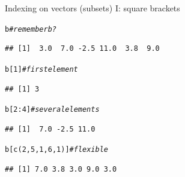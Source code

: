 \documentclass[xcolor=table,           xcolor=dvipsnames]{beamer}\usepackage[]{graphicx}\usepackage[]{color}
\makeatletter
\newcommand{\hlnum}[1]{\textcolor[rgb]{0,0,0}{#1}}
\newcommand{\hlcom}[1]{\textcolor[rgb]{0,0.392,0}{\textit{#1}}}
\newcommand{\hlopt}[1]{\textcolor[rgb]{0,0,0}{#1}}
\newcommand{\hlstd}[1]{\textcolor[rgb]{0,0,0}{#1}}
\newcommand{\hlkwd}[1]{\textcolor[rgb]{0,0,1}{#1}}
\newenvironment{kframe}{%
 \def\at@end@of@kframe{}%
 \ifinner\ifhmode%
  \def\at@end@of@kframe{\end{minipage}}%
  \begin{minipage}{\columnwidth}%
 \fi\fi%
 \def\FrameCommand##1{\hskip\@totalleftmargin \hskip-\fboxsep
 \colorbox{shadecolor}{##1}\hskip-\fboxsep
     \hskip-\linewidth \hskip-\@totalleftmargin \hskip\columnwidth}%
 \MakeFramed {\advance\hsize-\width
   \@totalleftmargin\z@ \linewidth\hsize
   \@setminipage}}%
 {\par\unskip\endMakeFramed%
 \at@end@of@kframe}
\newenvironment{knitrout}{}{} %
\makeatother
\begin{document}
\begin{frame}[fragile]{Indexing on vectors (subsets) I: square brackets}
\begin{knitrout}
\color{fgcolor}\begin{kframe}
\begin{alltt}
\hlstd{b} \hlcom{# remember b?}
\end{alltt}
\begin{verbatim}
## [1]  3.0  7.0 -2.5 11.0  3.8  9.0
\end{verbatim}
\begin{alltt}
\hlstd{b[}\hlnum{1}\hlstd{]} \hlcom{# first element}
\end{alltt}
\begin{verbatim}
## [1] 3
\end{verbatim}
\end{kframe}
\end{knitrout}
\begin{knitrout}
\color{fgcolor}\begin{kframe}
\begin{alltt}
\hlstd{b[}\hlnum{2}\hlopt{:}\hlnum{4}\hlstd{]} \hlcom{# several elements}
\end{alltt}
\begin{verbatim}
## [1]  7.0 -2.5 11.0
\end{verbatim}
\begin{alltt}
\hlstd{b[} \hlkwd{c}\hlstd{(}\hlnum{2}\hlstd{,}\hlnum{5}\hlstd{,}\hlnum{1}\hlstd{,}\hlnum{6}\hlstd{,}\hlnum{1}\hlstd{) ]} \hlcom{# flexible}
\end{alltt}
\begin{verbatim}
## [1] 7.0 3.8 3.0 9.0 3.0
\end{verbatim}
\end{kframe}
\end{knitrout}
\end{frame}

\end{document}
